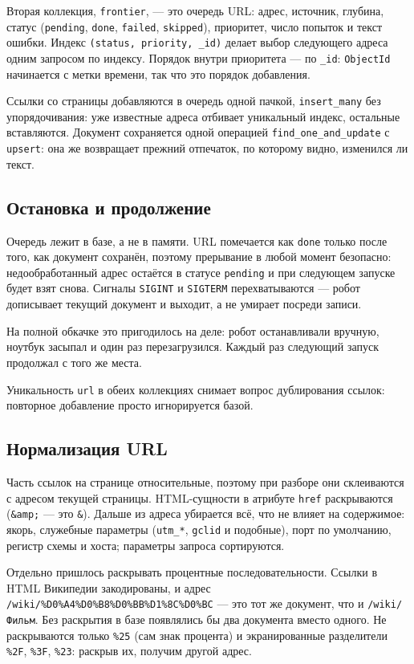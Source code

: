 Вторая коллекция, \texttt{frontier}, --- это очередь URL: адрес, источник,
глубина, статус (\texttt{pending}, \texttt{done}, \texttt{failed},
\texttt{skipped}), приоритет, число попыток и текст ошибки. Индекс
\texttt{(status, priority, \_id)} делает выбор следующего адреса одним запросом
по индексу. Порядок внутри приоритета --- по \texttt{\_id}: \texttt{ObjectId}
начинается с метки времени, так что это порядок добавления.

Ссылки со страницы добавляются в очередь одной пачкой, \texttt{insert\_many} без
упорядочивания: уже известные адреса отбивает уникальный индекс, остальные
вставляются. Документ сохраняется одной операцией
\texttt{find\_one\_and\_update} с \texttt{upsert}: она же возвращает прежний
отпечаток, по которому видно, изменился ли текст.

\subsection*{Остановка и продолжение}

Очередь лежит в базе, а не в памяти. URL помечается как \texttt{done} только
после того, как документ сохранён, поэтому прерывание в любой момент безопасно:
недообработанный адрес остаётся в статусе \texttt{pending} и при следующем
запуске будет взят снова. Сигналы \texttt{SIGINT} и \texttt{SIGTERM}
перехватываются --- робот дописывает текущий документ и выходит, а не умирает
посреди записи.

На полной обкачке это пригодилось на деле: робот останавливали вручную,
ноутбук засыпал и один раз перезагрузился. Каждый раз следующий запуск
продолжал с того же места.

Уникальность \texttt{url} в обеих коллекциях снимает вопрос дублирования ссылок:
повторное добавление просто игнорируется базой.

\subsection*{Нормализация URL}

Часть ссылок на странице относительные, поэтому при разборе они склеиваются с
адресом текущей страницы. HTML-сущности в атрибуте \texttt{href} раскрываются
(\texttt{\&amp;} --- это \texttt{\&}). Дальше из адреса убирается всё, что не
влияет на содержимое: якорь, служебные параметры (\texttt{utm\_*}, \texttt{gclid}
и подобные), порт по умолчанию, регистр схемы и хоста; параметры запроса
сортируются.

Отдельно пришлось раскрывать процентные последовательности. Ссылки в HTML
Википедии закодированы, и адрес \texttt{/wiki/\%D0\%A4\%D0\%B8\%D0\%BB\%D1\%8C\%D0\%BC}
--- это тот же документ, что и \texttt{/wiki/Фильм}. Без раскрытия в базе
появлялись бы два документа вместо одного. Не раскрываются только \texttt{\%25}
(сам знак процента) и экранированные разделители \texttt{\%2F}, \texttt{\%3F},
\texttt{\%23}: раскрыв их, получим другой адрес.

